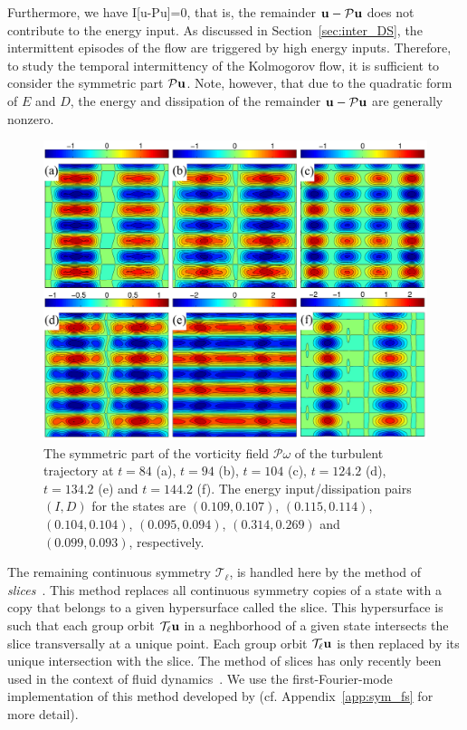 \documentclass{jfm}
\begin{document}
Furthermore, we have
\beq
I[\vc u-\mathcal P\vc u]=0,
\label{eq:I_lin}
\eeq
that is, the remainder $\mathbf u-\mathcal P\mathbf u$ does not contribute to the energy input.
As discussed in Section~\ref{sec:inter_DS}, the intermittent episodes of the flow are triggered
by high energy inputs. Therefore, to study the temporal intermittency of the Kolmogorov flow, it is
sufficient to consider the symmetric part $\mathcal P\mathbf u$.
Note, however, that due to the quadratic form of $E$ and $D$,
the energy and dissipation of the remainder $\mathbf u-\mathcal P\mathbf u$
are generally nonzero.
%
\begin{figure}
\centering
\includegraphics[width=\textwidth]{Pw_erg}
\caption{The symmetric part of the vorticity field $\mathcal P\omega$
of the turbulent trajectory at
$t=84$ (a),
$t=94$ (b),
$t=104$ (c),
$t=124.2$ (d),
$t=134.2$ (e) and
$t=144.2$ (f).
The energy input/dissipation pairs $(I,D)$ for the states are
$(0.109,0.107)$,
$(0.115,0.114)$,
$(0.104,0.104)$,
$(0.095,0.094)$,
$(0.314,0.269)$ and
$(0.099,0.093)$, respectively.}
\label{fig:Pw_erg}
\end{figure}

The remaining continuous symmetry $\mathcal T_\ell$, is handled here by the method of
\emph{slices}~\citep{cartan35,field80,rowley03}.
This method replaces all continuous symmetry copies of a
state with a
copy that belongs to a given hypersurface called the slice. This hypersurface is such that each
group orbit $\mathcal T_\ell\mathbf u$
in a neghborhood of a given state
intersects the slice transversally at a unique point.
Each group orbit $\mathcal T_\ell\mathbf u$ is then replaced by its unique intersection with the slice.
The method of slices has only recently been used in the context of fluid
dynamics~\citep{ACHKW11,WSC15}.
We use the first-Fourier-mode implementation of this
method developed by (cf. Appendix~\ref{app:sym_fs} for more detail).
\end{document}
